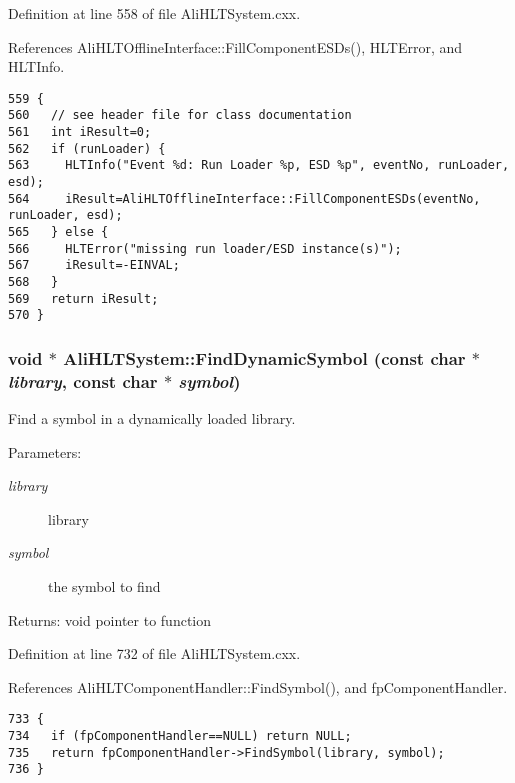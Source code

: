 Definition at line 558 of file Ali\-HLTSystem.cxx.

References Ali\-HLTOffline\-Interface::Fill\-Component\-ESDs(), HLTError, and HLTInfo.

\footnotesize\begin{verbatim}559 {
560   // see header file for class documentation
561   int iResult=0;
562   if (runLoader) {
563     HLTInfo("Event %d: Run Loader %p, ESD %p", eventNo, runLoader, esd);
564     iResult=AliHLTOfflineInterface::FillComponentESDs(eventNo, runLoader, esd);
565   } else {
566     HLTError("missing run loader/ESD instance(s)");
567     iResult=-EINVAL;
568   }
569   return iResult;
570 }
\end{verbatim}\normalsize 


\subsubsection{\setlength{\rightskip}{0pt plus 5cm}void $\ast$ Ali\-HLTSystem::Find\-Dynamic\-Symbol (const char $\ast$ {\em library}, const char $\ast$ {\em symbol})}\label{classAliHLTSystem_a23}


Find a symbol in a dynamically loaded library. \begin{Desc}
\item[Parameters:]
\begin{description}
\item[{\em library}]library \item[{\em symbol}]the symbol to find \end{description}
\end{Desc}
\begin{Desc}
\item[Returns:]void pointer to function \end{Desc}


Definition at line 732 of file Ali\-HLTSystem.cxx.

References Ali\-HLTComponent\-Handler::Find\-Symbol(), and fp\-Component\-Handler.

\footnotesize\begin{verbatim}733 {
734   if (fpComponentHandler==NULL) return NULL;
735   return fpComponentHandler->FindSymbol(library, symbol);
736 }
\end{verbatim}\normalsize 


